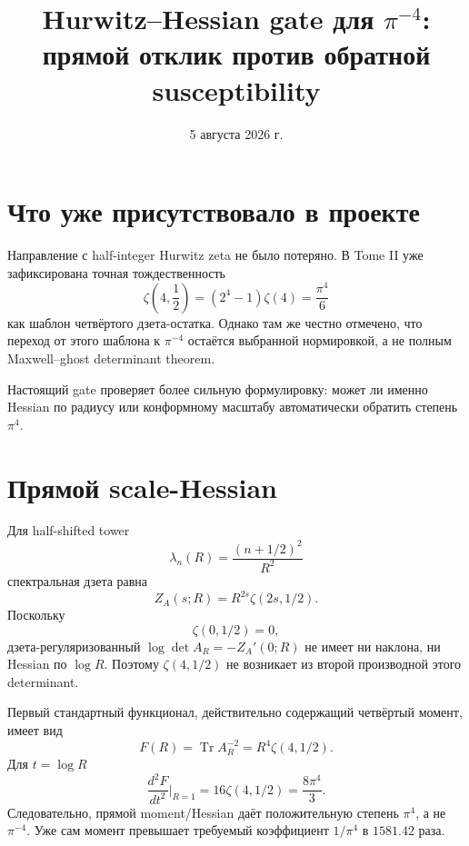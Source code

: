 \documentclass[12pt,a4paper]{article}
\title{Hurwitz--Hessian gate для $\pi^{-4}$:\\
прямой отклик против обратной susceptibility}
\author{}
\date{5 августа 2026 г.}
\DeclareMathOperator{\Tr}{Tr}
\begin{document}
\maketitle

\section{Что уже присутствовало в проекте}

Направление с half-integer Hurwitz zeta не было потеряно. В Tome II уже
зафиксирована точная тождественность
\begin{equation}
 \zeta\left(4,\frac12\right)
 =(2^4-1)\zeta(4)=\frac{\pi^4}{6}
\end{equation}
как шаблон четвёртого дзета-остатка. Однако там же честно отмечено, что переход
от этого шаблона к $\pi^{-4}$ остаётся выбранной нормировкой, а не полным
Maxwell--ghost determinant theorem.

Настоящий gate проверяет более сильную формулировку: может ли именно Hessian по
радиусу или конформному масштабу автоматически обратить степень $\pi^4$.

\section{Прямой scale-Hessian}

Для half-shifted tower
\begin{equation}
 \lambda_n(R)=\frac{(n+1/2)^2}{R^2}
\end{equation}
спектральная дзета равна
\begin{equation}
 Z_A(s;R)=R^{2s}\zeta(2s,1/2).
\end{equation}
Поскольку
\begin{equation}
 \zeta(0,1/2)=0,
\end{equation}
дзета-регуляризованный $\log\det A_R=-Z_A'(0;R)$ не имеет ни наклона, ни
Hessian по $\log R$. Поэтому $\zeta(4,1/2)$ не возникает из второй производной
этого determinant.

Первый стандартный функционал, действительно содержащий четвёртый момент,
имеет вид
\begin{equation}
 F(R)=\Tr A_R^{-2}=R^4\zeta(4,1/2).
\end{equation}
Для $t=\log R$
\begin{equation}
 \frac{d^2F}{dt^2}\bigg|_{R=1}
 =16\zeta(4,1/2)=\frac{8\pi^4}{3}.
\end{equation}
Следовательно, прямой moment/Hessian даёт положительную степень $\pi^4$, а не
$\pi^{-4}$. Уже сам момент превышает требуемый коэффициент $1/\pi^4$ в
$1581.42$ раза.
\end{document}
